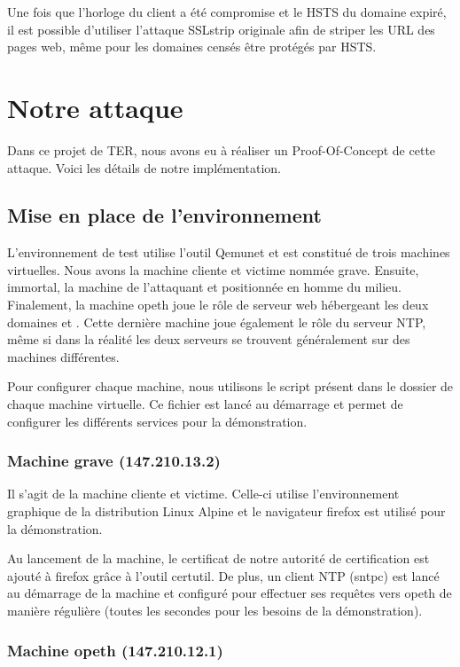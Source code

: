 Une fois que l'horloge du client a été compromise et le HSTS du domaine expiré, il est possible d'utiliser l'attaque SSLstrip originale afin de striper les URL des pages web, même pour les domaines censés être protégés par HSTS.

\section{Notre attaque}

Dans ce projet de TER, nous avons eu à réaliser un Proof-Of-Concept de cette attaque. Voici les détails de notre implémentation.

\subsection{Mise en place de l'environnement}

L'environnement de test utilise l'outil Qemunet et est constitué de trois machines virtuelles. Nous avons la machine cliente et victime nommée grave. Ensuite, immortal, la machine de l'attaquant et positionnée en homme du milieu. Finalement, la machine opeth joue le rôle de serveur web hébergeant les deux domaines  et . Cette dernière machine joue également le rôle du serveur NTP, même si dans la réalité les deux serveurs se trouvent généralement sur des machines différentes.

Pour configurer chaque machine, nous utilisons le script  présent dans le dossier de chaque machine virtuelle. Ce fichier est lancé au démarrage et permet de configurer les différents services pour la démonstration.

\subsubsection{Machine grave (147.210.13.2)}

Il s'agit de la machine cliente et victime. Celle-ci utilise l'environnement graphique de la distribution Linux Alpine et le navigateur firefox est utilisé pour la démonstration.

Au lancement de la machine, le certificat de notre autorité de certification est ajouté à firefox grâce à l'outil certutil. De plus, un client NTP (sntpc) est lancé au démarrage de la machine et configuré pour effectuer ses requêtes vers opeth de manière régulière (toutes les secondes pour les besoins de la démonstration).

\subsubsection{Machine opeth (147.210.12.1)}


